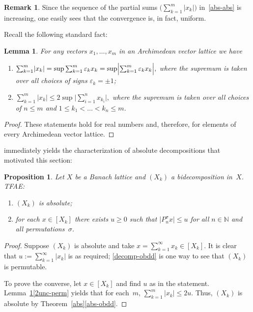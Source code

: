 \documentclass[12pt]{amsart}
\theoremstyle{plain}
\newtheorem{proposition}[theorem]{Proposition}
\newtheorem{lemma}[theorem]{Lemma}
\theoremstyle{definition}
\newtheorem{remark}[theorem]{Remark}
\newcommand{\abs}[1]{\lvert#1\rvert}
\newcommand{\bigabs}[1]{\bigl\lvert#1\bigr\rvert}
\newcommand{\Bigabs}[1]{\Bigl\lvert#1\Bigr\rvert}
\renewcommand{\le}{\leqslant}
\renewcommand{\ge}{\geqslant}
\begin{document}
\begin{remark}
  Since the sequence of the partial sums
  $\bigl(\sum_{k=1}^m\abs{x_k}\bigr)$ in~\eqref{abs-abs} is
  increasing, one easily sees that the convergence is, in fact,
  uniform.
\end{remark}

Recall the following standard fact:

\begin{lemma}\label{2unc}
  For any vectors $x_1,\dots,x_m$ in an Archimedean vector lattice we
  have
  \begin{enumerate}
  \item\label{2unc-signs}
  \begin{math}
    \sum_{k=1}^m\abs{x_k}
    =\sup\sum_{k=1}^m\varepsilon_k x_k
    =\sup\Bigabs{\sum_{k=1}^m\varepsilon_k x_k},
  \end{math}
  where the supremum is taken over all choices of signs $\varepsilon_k=\pm
  1$;
  \item\label{2unc-perm}
  \begin{math}
    \sum_{k=1}^m\abs{x_k}\le 2\sup\bigabs{\sum_{i=1}^nx_{k_i}},
  \end{math}
  where the supremum is taken over all choices of $n\le m$ and $1\le
  k_1<\dots<k_n\le m$. 
  \end{enumerate}  
\end{lemma}

\begin{proof}
  These statements hold for real numbers and, therefore, for
  elements of every Archimedean vector lattice.
\end{proof}

 immediately yields the characterization of absolute
decompositions that motivated this section:

\begin{proposition}\label{abs-perm}
  Let $X$ be a Banach lattice and $(X_k)$ a bidecomposition in~$X$. TFAE:
  \begin{enumerate}
  \item $(X_k)$ is absolute;
  \item for each $x\in [X_k]$ there exists $u\ge 0$ such that
    $\abs{P_n^\sigma x}\le u$ for all $n\in\mathbb N$ and all
    permutations~$\sigma$.
  \end{enumerate}   
\end{proposition}

\begin{proof}
  Suppose $(X_k)$ is absolute and take
  $x=\sum_{k=1}^\infty x_k\in [X_k]$.  It is clear that
  $u:=\sum_{k=1}^\infty\abs{x_k}$ is as required;
  \eqref{decomp-obdd} is one way to see that $(X_k)$ is
  permutable.

  To prove the converse, let $x\in [X_k]$ and find $u$ as in the
  statement. Lemma~\ref{2unc}\eqref{2unc-perm} yields that for
  each~$m$,
  \begin{math}
    \sum_{k=1}^m\abs{x_k}\le 2u.
  \end{math}
  Thus, $(X_k)$ is absolute by Theorem~\ref{abs}\eqref{abs-obdd}.
\end{proof}
\end{document}
